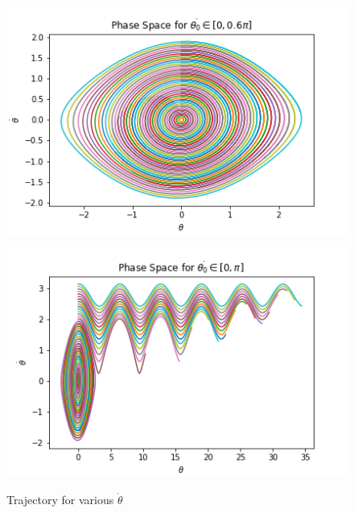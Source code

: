 \documentclass[12pt]{article}
\newenvironment{problem}[2][]{\begin{trivlist}
\item[\hskip \labelsep {\bfseries #1}\hskip \labelsep {\bfseries #2.}]}{\end{trivlist}}
\begin{document}
\begin{problem}{1}
\begin{figure}[ht!]
	\centering
	\begin{minipage}[b]{0.4\textwidth}
		\includegraphics[scale=0.6]{../figures/phaseSpaceDot.png}
		\label{phaseDot}
	\end{minipage}
	\hfill
	\begin{minipage}[b]{0.4\textwidth}
		\includegraphics[scale=0.6]{../figures/phaseSpaceDot2.png}
		\label{phaseDot2}
	\end{minipage}
	\caption{Trajectory for various $\dot{\theta}$}
\end{figure}
\end{problem}
\end{document}
